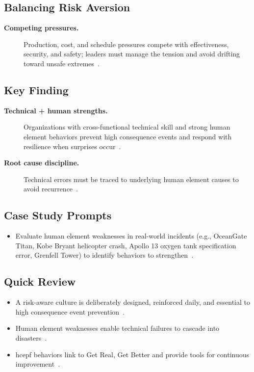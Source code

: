 \documentclass[../main.tex]{subfiles}
\begin{document}
\subsection{Balancing Risk Aversion}
\begin{description}
  \item[\textbf{Competing pressures.}] Production, cost, and schedule pressures compete with effectiveness, security, and safety; leaders must manage the tension and avoid drifting toward unsafe extremes~\autocite{edo-5-1-10-hce-management-2025}.
\end{description}

\subsection{Key Finding}
\begin{description}
  \item[\textbf{Technical + human strengths.}] Organizations with cross-functional technical skill and strong human element behaviors prevent high consequence events and respond with resilience when surprises occur~\autocite{edo-5-1-10-hce-management-2025}.
  \item[\textbf{Root cause discipline.}] Technical errors must be traced to underlying human element causes to avoid recurrence~\autocite{edo-5-1-10-hce-management-2025}.
\end{description}

\subsection{Case Study Prompts}
\begin{itemize}
  \item Evaluate human element weaknesses in real-world incidents (e.g., OceanGate Titan, Kobe Bryant helicopter crash, Apollo 13 oxygen tank specification error, Grenfell Tower) to identify behaviors to strengthen~\autocite{edo-5-1-10-hce-management-2025}.
\end{itemize}

\subsection{Quick Review}
\begin{itemize}
  \item A risk-aware culture is deliberately designed, reinforced daily, and essential to high consequence event prevention~\autocite{edo-5-1-10-hce-management-2025}.
  \item Human element weaknesses enable technical failures to cascade into disasters~\autocite{edo-5-1-10-hce-management-2025}.
  \item \ac{hcepf} behaviors link to Get Real, Get Better and provide tools for continuous improvement~\autocite{edo-5-1-10-hce-management-2025}.
\end{itemize}

\end{document}

